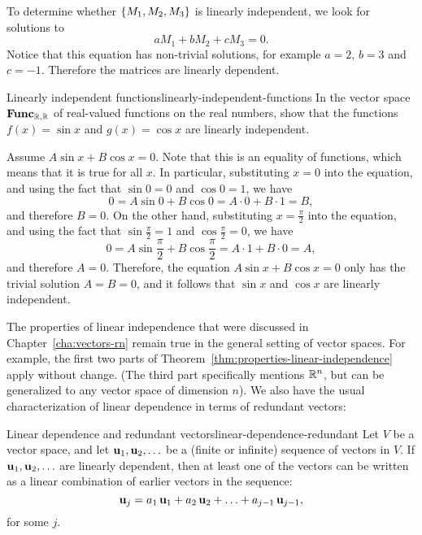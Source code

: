 \begin{solution}
  To determine whether $\left\{M_1,M_2,M_3\right\}$ is linearly independent, we
  look for solutions to
  \begin{equation*}
    aM_1 + bM_2 + cM_3 = 0.
  \end{equation*}
  Notice that this equation has non-trivial solutions, for example
  $a=2$, $b=3$ and $c=-1$. Therefore the matrices are linearly
  dependent.
\end{solution}

\begin{example}{Linearly independent functions}{linearly-independent-functions}
  In the vector space $\mathbf{Func}_{\mathbb{R},\mathbb{R}}$ of real-valued functions on the
  real numbers, show that the functions $f(x)=\sin x$ and $g(x)=\cos
  x$ are linearly independent.
\end{example}

\begin{solution}
  Assume $A\sin x+B\cos x=0$. Note that this is an equality of
  functions, which means that it is true for all $x$. In particular,
  substituting $x=0$ into the equation, and using the fact that
  $\sin 0=0$ and $\cos 0=1$, we have
  \begin{equation*}
    0 = A\sin 0 + B\cos 0 = A\cdot 0 + B\cdot 1 = B,
  \end{equation*}
  and therefore $B=0$. On the other hand, substituting
  $x=\frac{\pi}{2}$ into the equation, and using the fact that
  $\sin\frac{\pi}{2} = 1$ and $\cos\frac{\pi}{2}=0$, we have
  \begin{equation*}
    0 = A\sin\frac{\pi}{2} + B\cos\frac{\pi}{2} = A\cdot 1 + B\cdot 0
    = A,
  \end{equation*}
  and therefore $A=0$. Therefore, the equation $A\sin x+B\cos x=0$
  only has the trivial solution $A=B=0$, and it follows that $\sin x$
  and $\cos x$ are linearly independent.
\end{solution}

The properties of linear independence that were discussed in
Chapter~\ref{cha:vectors-rn} remain true in the general setting of
vector spaces. For example, the first two parts of
Theorem~\ref{thm:properties-linear-independence} apply without change.
(The third part specifically mentions $\mathbb{R}^n$, but can be generalized
to any vector space of dimension $n$). We also have the usual
characterization of linear dependence in terms of redundant vectors:

\begin{proposition}{Linear dependence and redundant vectors}{linear-dependence-redundant}
  Let $V$ be a vector space, and let $\vect{u}_1,\vect{u}_2,\ldots$ be
  a (finite or infinite) sequence of vectors in $V$. If
  $\vect{u}_1,\vect{u}_2,\ldots$ are linearly dependent, then at least
  one of the vectors can be written as a linear combination of earlier
  vectors in the sequence:
  \begin{equation*}
    \vect{u}_j = a_1\,\vect{u}_1 + a_2\,\vect{u}_2 + \ldots + a_{j-1}\,\vect{u}_{j-1},
  \end{equation*}
  for some $j$.
\end{proposition}


